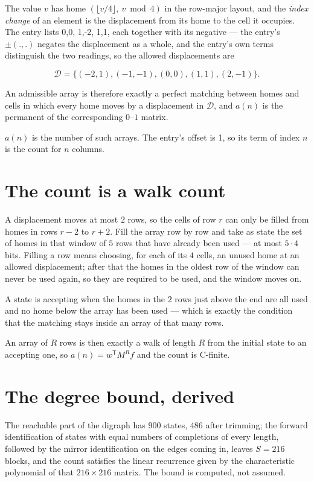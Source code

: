 \documentclass[11pt]{article}
\theoremstyle{definition}
\begin{document}
The value $v$ has home $(\lfloor v/4\rfloor,\ v \bmod 4)$ in the row-major layout, and the {\itshape index change} of an element is the displacement from its home to the cell it occupies. The entry lists 0,0, 1,-2, 1,1, each together with its negative --- the entry's $\pm(.,.)$ negates the displacement as a whole, and the entry's own terms distinguish the two readings, so the allowed displacements are

\[\mathcal{D} = \{(-2,1), (-1,-1), (0,0), (1,1), (2,-1)\}.\]

An admissible array is therefore exactly a perfect matching between homes and cells in which every home moves by a displacement in $\mathcal{D}$, and $a(n)$ is the permanent of the corresponding $0$--$1$ matrix.

$a(n)$ is the number of such arrays. The entry's offset is 1, so its term of index $n$ is the count for $n$ columns.

\section{The count is a walk count}

A displacement moves at most $2$ rows, so the cells of row $r$ can only be filled from homes in rows $r-2$ to $r+2$. Fill the array row by row and take as state the set of homes in that window of $5$ rows that have already been used --- at most $5\cdot4$ bits. Filling a row means choosing, for each of its $4$ cells, an unused home at an allowed displacement; after that the homes in the oldest row of the window can never be used again, so they are required to be used, and the window moves on.

A state is accepting when the homes in the $2$ rows just above the end are all used and no home below the array has been used --- which is exactly the condition that the matching stays inside an array of that many rows.

An array of $R$ rows is then exactly a walk of length $R$ from the initial state to an accepting one, so $a(n) = w^{\mathsf T}M^{R}f$ and the count is C-finite.

\section{The degree bound, derived}

The reachable part of the digraph has $900$ states, $486$ after trimming; the forward identification of states with equal numbers of completions of every length, followed by the mirror identification on the edges coming in, leaves $S = 216$ blocks, and the count satisfies the linear recurrence given by the characteristic polynomial of that $216\times216$ matrix. The bound is computed, not assumed.
\end{document}
